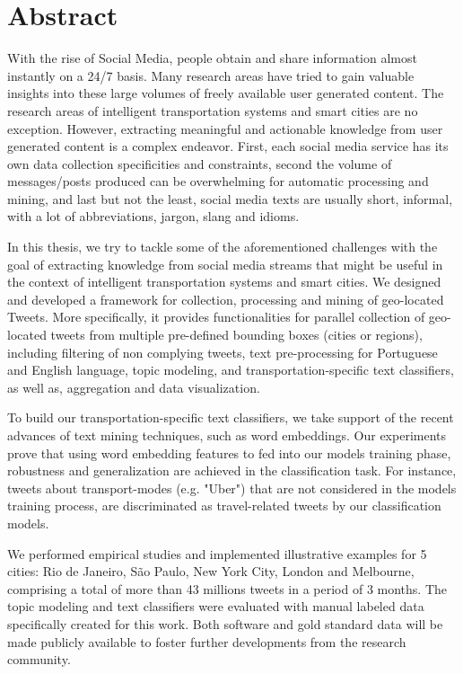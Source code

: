 \chapter*{Abstract}

With the rise of Social Media, people obtain and share information almost instantly on a 24/7 basis. Many research areas have tried to gain valuable insights into these large volumes of freely available user generated content. The research areas of intelligent transportation systems and smart cities are no exception. However, extracting meaningful and actionable knowledge from user generated content is a complex endeavor. First, each social media service has its own data collection specificities and constraints, second the volume of messages/posts produced can be overwhelming for automatic processing and mining, and last but not the least, social media texts are usually short, informal, with a lot of abbreviations, jargon, slang and idioms.
 
In this thesis, we try to tackle some of the aforementioned challenges with the goal of extracting knowledge from social media streams that might be useful in the context of intelligent transportation systems and smart cities. We designed and developed a framework for collection, processing and mining of geo-located Tweets. More specifically, it provides functionalities for parallel collection of geo-located tweets from multiple pre-defined bounding boxes (cities or regions), including filtering of non complying tweets, text pre-processing for Portuguese and English language, topic modeling, and transportation-specific text classifiers, as well as, aggregation and data visualization.

To build our transportation-specific text classifiers, we take support of the recent advances of text mining techniques, such as word embeddings. Our experiments prove that using word embedding features to fed into our models training phase, robustness and generalization are achieved in the classification task. For instance, tweets about transport-modes (e.g. "Uber") that are not considered in the models training process, are discriminated as travel-related tweets by our classification models.

We performed empirical studies and implemented illustrative examples for 5 cities: Rio de Janeiro, São Paulo, New York City, London and Melbourne, comprising a total of more than 43 millions tweets in a period of 3 months. The topic modeling and text classifiers were evaluated with manual labeled data specifically created for this work. Both software and gold standard data will be made publicly available to foster further developments from the research community.


